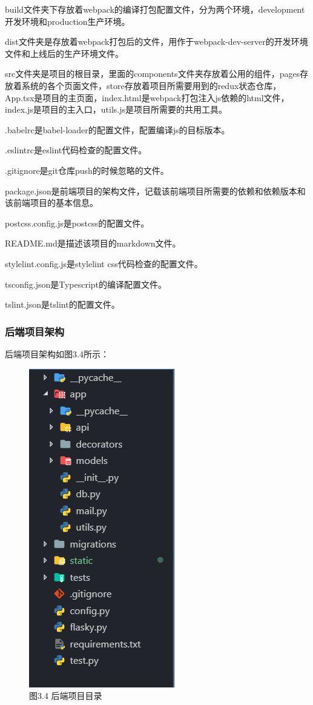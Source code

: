 build文件夹下存放着webpack的编译打包配置文件，分为两个环境，development开发环境和production生产环境。

dist文件夹是存放着webpack打包后的文件，用作于webpack-dev-server的开发环境文件和上线后的生产环境文件。

src文件夹是项目的根目录，里面的components文件夹存放着公用的组件，pages存放着系统的各个页面文件，store存放着项目所需要用到的redux状态仓库，App.tsx是项目的主页面，index.html是webpack打包注入js依赖的html文件，index.js是项目的主入口，utils.js是项目所需要的共用工具。

.babelrc是babel-loader的配置文件，配置编译js的目标版本。

.eslintrc是eslint代码检查的配置文件。

.gitignore是git仓库push的时候忽略的文件。

package.json是前端项目的架构文件，记载该前端项目所需要的依赖和依赖版本和该前端项目的基本信息。

postcss.config.js是postcss的配置文件。

README.md是描述该项目的markdown文件。

stylelint.config.js是stylelint css代码检查的配置文件。

tsconfig.json是Typescript的编译配置文件。

tslint.json是tslint的配置文件。

\subsubsection{后端项目架构}

后端项目架构如图3.4所示：

\begin{figure}[thbp!]
	\centering
	\includegraphics[width=0.3\linewidth]{figure/backend_structure}
	\label{fig:backend_structure} \\
		图3.4 后端项目目录
\end{figure}

